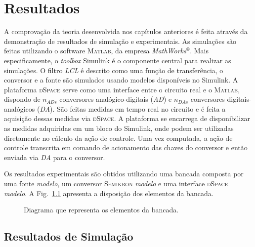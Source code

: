 
\chapter{Resultados}\label{resultados}

    A comprovação da teoria desenvolvida nos capítulos anteriores é feita através da demonstração de resultados de simulação e experimentais. As simulações são feitas utilizando o software \textsc{Matlab}, da empresa \textit{MathWorks}$^\circledR$. Mais especificamente, o \textit{toolbox} Simulink é o componente central para realizar as simulações. O filtro \textit{LCL} é descrito como uma função de transferência, o conversor e a fonte são simulados usando modelos disponíveis no Simulink. A plataforma \textsc{dSpace} serve como uma interface entre o circuito real e o \textsc{Matlab}, dispondo de $n_{ADs}$ conversores analógico-digitais (\emph{AD}) e $n_{DAs}$ conversores digitais-analógicos (\emph{DA}). São feitas medidas em tempo real no circuito e é feita a aquisição dessas medidas via \textsc{dSpace}. A plataforma se encarrega de disponibilizar as medidas adquiridas em um bloco do Simulink, onde podem ser utilizadas diretamente no cálculo da ação de controle. Uma vez computada, a ação de controle transcrita em comando de acionamento das chaves do conversor e então enviada via \emph{DA} para o conversor.

    Os resultados experimentais são obtidos utilizando uma bancada composta por uma fonte \textit{modelo}, um conversor \textsc{Semikron} \textit{modelo} e uma interface \textsc{dSpace} \textit{modelo}. A Fig.~\ref{fig:topologia_bancada} apresenta a disposição dos elementos da bancada.

    \begin{figure}[htb]
        \centering{
            \def\svgwidth{0.9\textwidth}
            }
        \renewcommand\figurename{Fig.}
        \caption{Diagrama que representa os elementos da bancada.}
        \label{fig:topologia_bancada}
    \end{figure}


\section{Resultados de Simulação}


